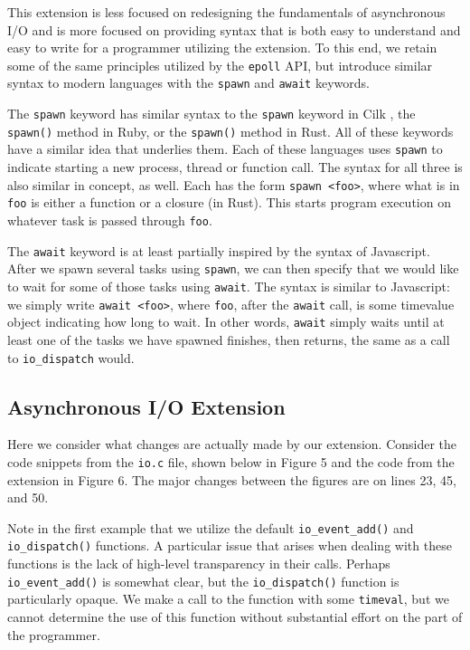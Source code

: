 \documentclass[main.tex]{subfiles}
\begin{document}
This extension is less focused on redesigning the fundamentals of asynchronous I/O and is more focused
on providing syntax that is both easy to understand and easy to write for a programmer utilizing the extension.
To this end, we retain some of the same principles utilized by the \verb|epoll| API, but introduce similar syntax to
modern languages with the \verb|spawn| and \verb|await| keywords.

The \verb|spawn| keyword has similar syntax to the \verb|spawn| keyword in Cilk \cite{2}, the \verb|spawn()| method in
Ruby, or the \verb|spawn()| method in Rust. All of these keywords have a similar idea that underlies them. Each of
these languages uses \verb|spawn| to indicate starting a new process, thread or function call. The syntax for all three is
also similar in concept, as well. Each has the form \verb|spawn <foo>|, where what is in \verb|foo| is either a function or
a closure (in Rust). This starts program execution on whatever task is passed through \verb|foo|.

The \verb|await| keyword is at least partially inspired by the syntax of Javascript. After we spawn several tasks using
\verb|spawn|, we can then specify that we would like to wait for some of those tasks using \verb|await|. The syntax is similar to
Javascript: we simply write \verb|await <foo>|, where \verb|foo|, after the \verb|await| call, is some timevalue object indicating how 
long to wait. In other words, \verb|await| simply waits until at least one of the tasks we have spawned
finishes, then returns, the same as a call to \verb|io_dispatch| would.

\subsection{Asynchronous I/O Extension}
Here we consider what changes are actually made by our extension. Consider the code snippets from the \verb|io.c| file, shown below
in Figure 5 and the code from the extension in Figure 6. The major changes between the figures are on lines 23, 45, and 50.

Note in the first example that we utilize the default \verb|io_event_add()| and \verb|io_dispatch()| functions. A particular
issue that arises when dealing with these functions is the lack of high-level transparency in their calls. Perhaps 
\verb|io_event_add()| is somewhat clear, but the \verb|io_dispatch()| function is particularly opaque. We make a call to the
function with some \verb|timeval|, but we cannot determine the use of this function without substantial effort on the part of the
programmer. 
\end{document}
